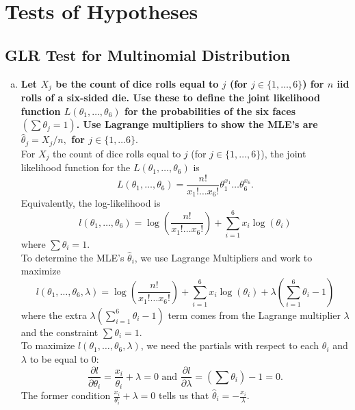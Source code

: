 \newpage
\setcounter{section}{5}
\section{Tests of Hypotheses}
\subsection{GLR Test for Multinomial Distribution}
\graphicspath{{notes/img}}

\begin{enumerate}[a)]
    \item \textbf{Let $X_j$ be the count of dice rolls equal to $j$ (for $j \in \{ 1, \dots, 6 \}$) for $n$ iid rolls of a six-sided die. Use these to define the joint likelihood function $L(\theta_1, \dots, \theta_6)$ for the probabilities of the six faces $(\sum \theta_j = 1)$. Use Lagrange multipliers to show the MLE's are $\hat{\theta}_j = X_j / n,$ for $j \in \{ 1, \dots 6\}.$} \\ 
    
     For $X_j$ the count of dice rolls equal to $j$ (for $j \in \{ 1, \dots, 6 \}$), the joint likelihood function for the $L(\theta_1, \dots, \theta_6)$ is
    \[
        L(\theta_1, \dots, \theta_6) = \frac{n!}{x_1! \dots x_6!}\theta_1^{x_1} \dots \theta_6^{x_6}.
    \]
    Equivalently, the log-likelihood is
    \[
        l(\theta_1, \dots, \theta_6) = \log \left(\frac{n!}{x_1! \dots x_6!}\right) + \sum_{i=1}^6 x_i \log(\theta_i)
    \]
    where $\sum \theta_i = 1$. \\

    To determine the MLE's $\hat{\theta}_i$, we use Lagrange Multipliers and work to maximize
    \[
        l(\theta_1, \dots, \theta_6, \lambda) = \log \left(\frac{n!}{x_1! \dots x_6!}\right) + \sum_{i=1}^6 x_i \log(\theta_i) + \lambda\left(\sum_{i=1}^6 \theta_i - 1\right)
    \]
    where the extra $\lambda(\sum\limits_{i=1}^6 \theta_i - 1)$ term comes from the Lagrange multiplier $\lambda$ and the constraint $\sum \theta_i = 1$. \\
    
    To maximize $l(\theta_1, \dots, \theta_6, \lambda)$, we need the partials with respect
    to each $\theta_i$ and $\lambda$ to be equal to $0$:
    \[
        \frac{\partial l}{\partial \theta_i} = \frac{x_i}{\theta_i} + \lambda = 0 \text{ and } \frac{\partial l}{\partial \lambda} = \left(\sum \theta_i \right) - 1 = 0.
    \]
    The former condition $\frac{x_i}{\theta_i} + \lambda = 0$ tells us that $\hat{\theta}_i = -\frac{x_i}{\lambda}$. \\
    

\end{enumerate}
